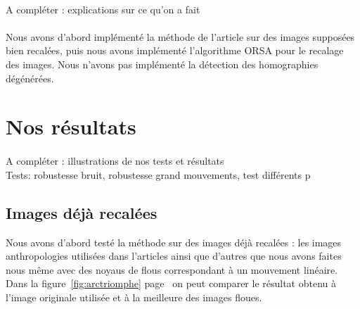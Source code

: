 \documentclass[a4paper,10pt]{report}
\begin{document}
\paragraph{}
A compléter : explications sur ce qu'on a fait
\paragraph{}
Nous avons d'abord implémenté la méthode de l'article sur des images supposées bien recalées, puis
nous avons implémenté l'algorithme ORSA pour le recalage des images. 
Nous n'avons pas implémenté la détection des homographies dégénérées.

\section{Nos résultats}
\paragraph{}
A compléter : illustrations de nos tests et résultats\\
Tests: robustesse bruit, robustesse grand mouvements, test différents p
\subsection{Images déjà recalées}
Nous avons d'abord testé la méthode sur des images déjà recalées : 
les images anthropologies utilisées dans l'articles ainsi que d'autres que nous avons faites 
nous même avec des noyaus de flous correspondant à un mouvement linéaire. Dans la figure~\ref{fig:arctriomphe}
page~\pageref{fig:arctriomphe} on peut comparer le résultat obtenu à
l'image originale utilisée et à la meilleure des images floues.
\end{document}
